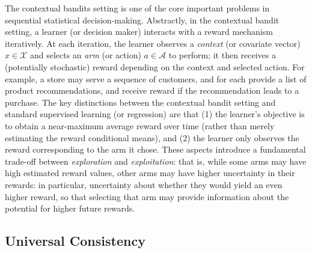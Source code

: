 \documentclass[aos]{imsart}
\theoremstyle{plain}
\theoremstyle{remark}
\newcommand{\Acal}{\mathcal{A}}
\newcommand{\Xcal}{\mathcal{X}}
\newcommand{\1}{\mathbbm{1}}%
\begin{document}
The contextual bandits setting is one of the core important problems in sequential statistical decision-making.
Abstractly, in the contextual bandit setting, a learner (or decision maker) interacts with a reward mechanism iteratively. At each iteration, the learner observes a \emph{context} (or covariate vector) $x \in \Xcal$
and selects an \emph{arm} (or action) $a\in \Acal$ to perform; it then receives a (potentially stochastic) reward depending on the context and selected action.
For example, a store may serve a sequence of customers, and for each provide a list of product recommendations, and receive reward if the recommendation leads to a purchase.
The key distinctions between the contextual bandit setting and standard supervised learning (or regression)
are that (1) the learner's objective is to obtain a near-maximum average reward over time (rather than merely estimating the reward conditional means),
and (2) the learner only observes the reward corresponding to the arm it chose.
These aspects introduce a fundamental trade-off between \emph{exploration} and \emph{exploitation}:
that is, while some arms may have high estimated reward values,
other arms may have higher uncertainty in their rewards: in particular, uncertainty about whether they would yield an even higher reward, 
so that selecting that arm may provide information about the potential for higher future rewards.

\subsection{Universal Consistency}
\end{document}
